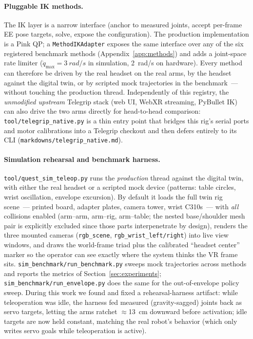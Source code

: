 \paragraph{Pluggable IK methods.}
The IK layer is a narrow interface (anchor to measured joints, accept
per-frame EE pose targets, solve, expose the configuration). The production
implementation is a Pink QP; a \texttt{MethodIKAdapter} exposes the same
interface over any of the six registered benchmark methods
(Appendix~\ref{app:methods}) and adds a joint-space rate limiter
(\(\dot q_{\max}=\SI{3}{rad/s}\) in simulation, \SI{2}{rad/s} on hardware).
Every method can therefore be driven by the real headset on the real arms,
by the headset against the digital twin, or by scripted mock trajectories in
the benchmark~--- without touching the production thread. Independently of
this registry, the \emph{unmodified upstream} Telegrip stack (web UI,
WebXR streaming, PyBullet IK) can also drive the two arms directly for
head-to-head comparison: \texttt{tool/telegrip\_native.py} is a thin entry
point that bridges this rig's serial ports and motor calibrations into a
Telegrip checkout and then defers entirely to its CLI
(\texttt{markdowns/telegrip\_native.md}).

\paragraph{Simulation rehearsal and benchmark harness.}
\texttt{tool/quest\_sim\_teleop.py} runs the \emph{production} thread
against the digital twin, with either the real headset or a scripted mock
device (patterns: table circles, wrist oscillation, envelope excursion).
By default it loads the full twin rig scene~--- printed board, adapter
plates, camera tower, wrist C310s~--- with \emph{all} collisions enabled
(arm--arm, arm--rig, arm--table; the nested base/shoulder mesh pair is
explicitly excluded since those parts interpenetrate by design), renders
the three mounted cameras (\texttt{rgb\_scene},
\texttt{rgb\_wrist\_left/right}) into live view windows, and draws the
world-frame triad plus the calibrated ``headset center'' marker so the
operator can see exactly where the system thinks the VR frame sits.
\texttt{sim\_benchmark/run\_benchmark.py} sweeps mock trajectories across
methods and reports the metrics of Section~\ref{sec:experiments};
\texttt{sim\_benchmark/run\_envelope.py} does the same for the
out-of-envelope policy sweep. During this work we found and fixed a
rehearsal-harness artifact: while teleoperation was idle, the harness fed
measured (gravity-sagged) joints back as servo targets, letting the arms
ratchet \(\approx\)\SI{13}{cm} downward before activation; idle targets are
now held constant, matching the real robot's behavior (which only writes
servo goals while teleoperation is active).

